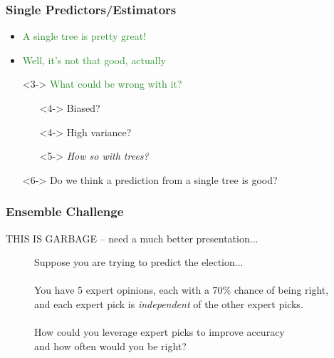\documentclass[xcolor={dvipsnames}]{beamer}
\begin{document}
\frame
{
 \frametitle{Single Predictors/Estimators}

\begin{itemize}
\item<1-> \textcolor{ForestGreen}{A single tree is pretty great! }
\item<2-> \textcolor{ForestGreen}{Well, it's not that good, actually }
\item[]<3-> \textcolor{ForestGreen}{What could be wrong with it?}
\begin{itemize}
\item[]<4-> \textcolor{Sepia}{Biased?}
\item[]<4-> \textcolor{Sepia}{High variance?} 
\item[]<5-> \textcolor{Sepia}{\emph{How so with trees?}} 
\end{itemize}
\item[]<6-> Do we think a prediction from a single tree is good? 


\end{itemize}
}



\frame
{
 \frametitle{Ensemble Challenge}
THIS IS GARBAGE -- need a much better presentation...


\begin{figure}
\centering
Suppose you are trying to predict the election...\\${}$\\
You have 5 expert opinions, each with a 70\% chance of being right,\\
and each expert pick is \emph{independent} of the other expert picks.\\${}$\\
How could you leverage expert picks to improve accuracy \\
and how often would you be right?


\vspace{.35in}

\color{blue}
\\${}$\\

\color{red}


\end{figure}
}
\end{document}
